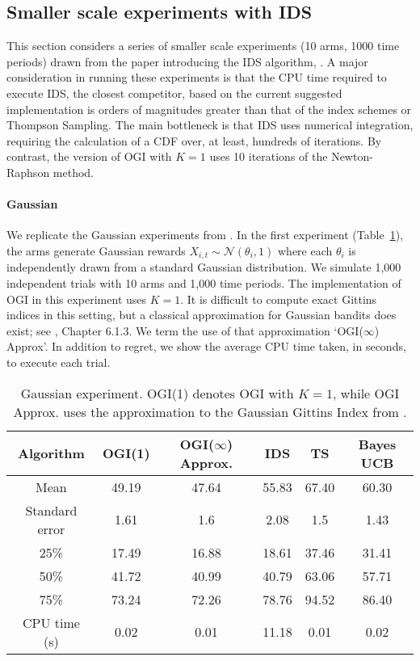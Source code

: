 \subsection{Smaller scale experiments with IDS}

This section considers a series of smaller scale experiments (10 arms, 1000 time periods) drawn from the paper introducing the IDS algorithm, \citep{russo2014learning}. A major consideration in running these experiments is that the CPU time required to execute IDS, the closest competitor, based on the current suggested implementation is orders of magnitudes greater than that of the index schemes or Thompson Sampling. The main bottleneck is that IDS uses numerical integration, requiring the calculation of a CDF over, at least, hundreds of iterations. By contrast, the version of OGI with $K=1$ uses 10 iterations of the Newton-Raphson method. 

\paragraph{Gaussian}We replicate the Gaussian experiments from \cite{russo2014learning}. In the first experiment (Table~\ref{table:gaussian_experiment1}), the arms generate Gaussian rewards  $X_{i,t} \sim \mathcal{N}(\theta_i, 1)$ where each $\theta_i$ is independently drawn from a standard Gaussian distribution. We simulate 1,000 independent trials with 10 arms and 1,000 time periods. The implementation of OGI in this experiment uses $K = 1$. It is difficult to compute exact Gittins indices in this setting, but a classical approximation for Gaussian bandits does exist; see \cite{powell2012optimal}, Chapter 6.1.3. We term the use of that approximation `OGI($\infty$) Approx'.  In addition to regret, we  show the average CPU time taken, in seconds, to execute each trial.
\begin{table}[h!]
	\centering
	\begin{tabular}{cccccc} \toprule
		\textbf{Algorithm}  & \textbf{OGI(1)} & \textbf{OGI($\infty$) Approx.} & \textbf{IDS} & \textbf{TS} & \textbf{Bayes UCB}\\ \midrule
		Mean   & 49.19 & 47.64  &  55.83 & 67.40 & 60.30  \\ 
		Standard error  & 1.61 & 1.6 & 2.08 & 1.5 & 1.43 \\ 
		25\%  & 17.49 & 16.88  & 18.61 & 37.46 & 31.41 \\
		50\%   & 41.72 & 40.99 & 40.79 & 63.06 & 57.71 \\ 
		75\%  & 73.24 & 72.26 & 78.76 & 94.52 & 86.40 \\ 
		CPU time (s) & 0.02 & 0.01 & 11.18 & 0.01 & 0.02 \\
		\bottomrule
	\end{tabular}
	\caption[Table caption text]{Gaussian experiment. OGI(1) denotes OGI with $K =1$, while OGI Approx. uses the approximation to the Gaussian Gittins Index from \cite{powell2012optimal}.}
	\label{table:gaussian_experiment1}
\end{table}

